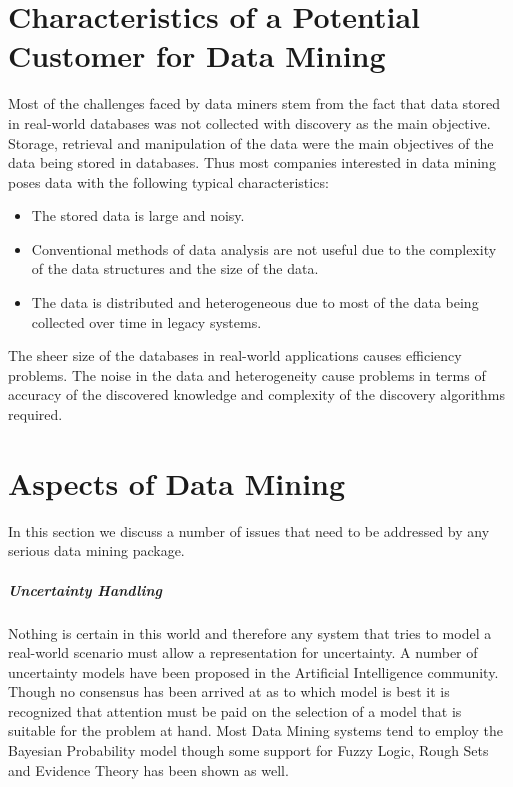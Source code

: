 \documentclass[a4paper,12pt,notitlepage,pdftex]{scrreprt}
\begin{document}
\chapter{Characteristics of a Potential Customer for Data Mining}
\label{chap:second}
    Most of the challenges faced by data miners stem from the fact that data stored in real-world databases was not
    collected with discovery as the main objective.
    Storage, retrieval and manipulation of the data were the main objectives of the data being stored in databases.
    Thus most companies interested in data mining poses data with the following typical characteristics:
    \begin{itemize}
        \item The stored data is large and noisy.
        \item Conventional methods of data analysis are not useful due to the complexity of the data structures and
            the size of the data.
        \item The data is distributed and heterogeneous due to most of the data being collected over time in legacy
            systems.
    \end{itemize}

    The sheer size of the databases in real-world applications causes efficiency problems.
    The noise in the data and heterogeneity cause problems in terms of accuracy of the discovered knowledge and
    complexity of the discovery algorithms required.

\chapter{Aspects of Data Mining}
\label{chap:third}
    In this section we discuss a number of issues that need to be addressed by any serious data mining package.

    \paragraph{Uncertainty Handling}
        Nothing is certain in this world and therefore any system that tries to model a real-world scenario must allow
        a representation for uncertainty.
        A number of uncertainty models have been proposed in the Artificial Intelligence community.
        Though no consensus has been arrived at as to which model is best it is recognized that attention must be paid
        on the selection of a model that is suitable for the problem at hand.
        Most Data Mining systems tend to employ the Bayesian Probability model though some support for Fuzzy Logic,
        Rough Sets and Evidence Theory has been shown as well.
\end{document}
